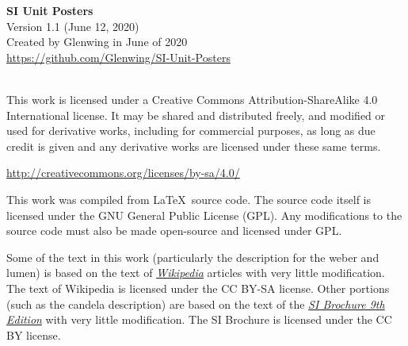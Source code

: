 \documentclass[letterpaper]{article}
\renewcommand{\,}{\hspace{0.2em}} %
\begin{document}
\raggedbottom
\nopagecolor %

\thispagestyle{empty}

\begin{center}
	{\Large \textbf{SI Unit Posters}}\\
	\large%
	Version 1.1 (June 12, 2020)\\
	Created by Glenwing in June of 2020\\
	\url{https://github.com/Glenwing/SI-Unit-Posters}\\
	\vspace{1cm}
	\ccLogo~\ccAttribution~\ccShareAlike
	\vspace{1cm}
\end{center}

\setlength\lineskip{0.5em}
\setlength\parskip{1em}
This work is licensed under a Creative Commons Attribution-ShareAlike 4.0 International license. It may be shared and distributed freely, and modified or used for derivative works, including for commercial purposes, as long as due credit is given and any derivative works are licensed under these same terms.

\url{http://creativecommons.org/licenses/by-sa/4.0/}

This work was compiled from \LaTeX\ source code. The source code itself is licensed under the GNU General Public License (GPL). Any modifications to the source code must also be made open-source and licensed under GPL.

Some of the text in this work (particularly the description for the weber and lumen) is based on the text of \href{https://en.wikipedia.org/wiki/Main_Page}{\textsl{Wikipedia}} articles with very little modification. The text of Wikipedia is licensed under the CC BY-SA license. Other portions (such as the candela description) are based on the text of the \href{https://www.bipm.org/utils/common/pdf/si-brochure/SI-Brochure-9-EN.pdf}{\textsl{SI Brochure 9th Edition}} with very little modification. The SI Brochure is licensed under the CC BY license.
\end{document}
